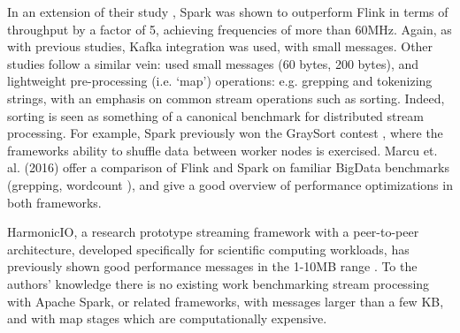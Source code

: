 \documentclass[conference]{IEEEtran}
\begin{document}
In an extension of their study \cite{grierExtendingYahooStreaming2016}, Spark was shown to outperform Flink in terms of throughput by a factor of 5, achieving frequencies of more than 60MHz. Again, as with previous studies, Kafka integration was used, with small messages.
Other studies follow a similar vein: \cite{qianBenchmarkingModernDistributed2016} used small messages (60 bytes, 200 bytes), and lightweight pre-processing (i.e. `map') operations: e.g. grepping and tokenizing strings, with an emphasis on common stream operations such as sorting. %
Indeed, sorting is seen as something of a canonical benchmark for distributed stream processing. For example, Spark previously won the GraySort contest \cite{xinApacheSparkFastest2014}, where the frameworks ability to shuffle%
data between worker nodes is exercised.
Marcu et. al. (2016)\nocite{marcuSparkFlinkUnderstanding2016} offer a comparison of Flink and Spark on familiar BigData benchmarks (grepping, wordcount%
), and give a good overview of performance optimizations in both frameworks. 

HarmonicIO, a research prototype streaming framework with a peer-to-peer architecture, developed 
specifically for scientific computing workloads, has previously shown good performance messages in the 1-10MB range \cite{torruangwatthanaHarmonicIOScalableData2018}. To the authors' knowledge there is no existing work benchmarking stream processing with Apache Spark, or related frameworks, with messages larger than a few KB, and with map stages which are computationally expensive.

\end{document}
